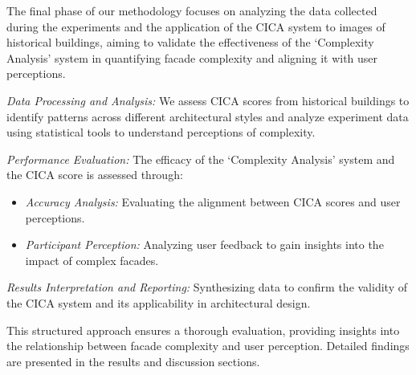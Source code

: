 The final phase of our methodology focuses on analyzing the data collected during the experiments and the application of the CICA system to images of historical buildings, aiming to validate the effectiveness of the `Complexity Analysis' system in quantifying facade complexity and aligning it with user perceptions.

\textit{Data Processing and Analysis:} We assess CICA scores from historical buildings to identify patterns across different architectural styles and analyze experiment data using statistical tools to understand perceptions of complexity.

\textit{Performance Evaluation:} The efficacy of the `Complexity Analysis' system and the CICA score is assessed through:
\begin{itemize}
    \item \textit{Accuracy Analysis:} Evaluating the alignment between CICA scores and user perceptions.
    \item \textit{Participant Perception:} Analyzing user feedback to gain insights into the impact of complex facades.
\end{itemize}

\textit{Results Interpretation and Reporting:} Synthesizing data to confirm the validity of the CICA system and its applicability in architectural design.

This structured approach ensures a thorough evaluation, providing insights into the relationship between facade complexity and user perception.
Detailed findings are presented in the results and discussion sections.
